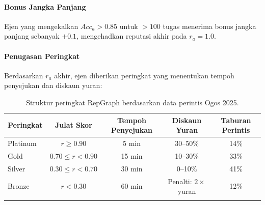 \documentclass[11pt]{article}
\begin{document}
\paragraph{Bonus Jangka Panjang} Ejen yang mengekalkan $Acc_a > 0.85$ untuk $>100$ tugas menerima bonus jangka panjang sebanyak $+0.1$, mengehadkan reputasi akhir pada $r_a = 1.0$.

\paragraph{Penugasan Peringkat} Berdasarkan $r_a$ akhir, ejen diberikan peringkat yang menentukan tempoh penyejukan dan diskaun yuran:
\begin{longtable}{@{}lcccc@{}}
\toprule
\textbf{Peringkat} & \textbf{Julat Skor} & \textbf{Tempoh Penyejukan} & \textbf{Diskaun Yuran} & \textbf{Taburan Perintis} \\\midrule
Platinum & $r \geq 0.90$ & 5 min & 30--50\% & 14\% \\
Gold & $0.70 \leq r < 0.90$ & 15 min & 10--30\% & 33\% \\
Silver & $0.30 \leq r < 0.70$ & 30 min & 0--10\% & 41\% \\
Bronze & $r < 0.30$ & 60 min & Penalti: $2 \times$ yuran & 12\% \\\bottomrule
\caption{Struktur peringkat RepGraph berdasarkan data perintis Ogos 2025.}
\label{tab:reputation-tiers}
\end{longtable}
\end{document}
